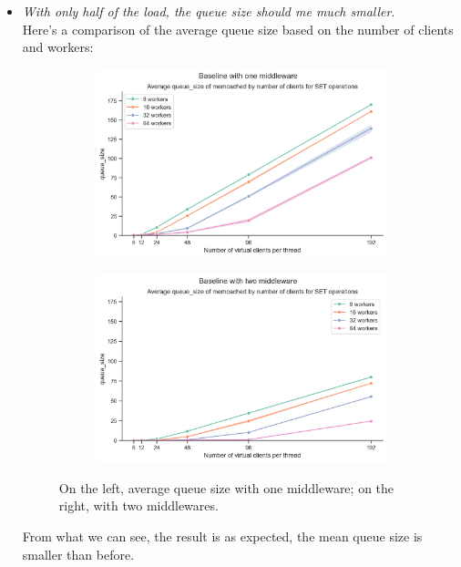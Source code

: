 \documentclass[11pt,a4paper]{article}
\begin{document}
\begin{itemize}
	\item \emph{With only half of the load, the queue size should me much smaller}. \\
		Here's a comparison of the average queue size based on the number of clients and workers:
		\begin{figure}[H]
			\begin{subfigure}[b]{0.5\linewidth}
				\includegraphics[width=\linewidth]{images/middleware_1/last_graph_set_queue_size.pdf}
			\end{subfigure}
			\begin{subfigure}[b]{0.5\linewidth}
				\includegraphics[width=\linewidth]{images/middleware_2/last_graph_set_queue_size.pdf}
			\end{subfigure}
			\caption{On the left, average queue size with one middleware; on the right, with two middlewares.}
			\label{fig:comparison_big}
		\end{figure}
		From what we can see, the result is as expected, the mean queue size is smaller than before. 	


\end{itemize}
\end{document}
